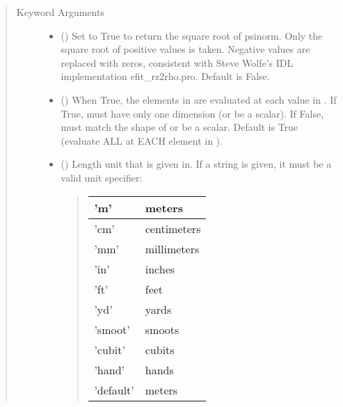 \documentclass[letterpaper,10pt,english]{sphinxmanual}
\begin{document}
\begin{fulllineitems}
\begin{fulllineitems}
\begin{quote}
\begin{description}
\begin{itemize}
\end{itemize}

\item[{Keyword Arguments}] \leavevmode\begin{itemize}
\item {} 
 () \textendash{} Set to True to return the square root of psinorm.
Only the square root of positive values is taken. Negative
values are replaced with zeros, consistent with Steve Wolfe’s
IDL implementation efit\_rz2rho.pro. Default is False.

\item {} 
 () \textendash{} When True, the elements in  are evaluated
at each value in . If True,  must have only one dimension
(or be a scalar). If False,  must match the shape of 
or be a scalar. Default is True (evaluate ALL  at EACH
element in ).

\item {} 
 () \textendash{} 
Length unit that  is given in.
If a string is given, it must be a valid unit specifier:
\begin{quote}


\begin{savenotes}\sphinxattablestart
\centering
\begin{tabulary}{\linewidth}[t]{|T|T|}
\hline

’m’
&
meters
\\
\hline
’cm’
&
centimeters
\\
\hline
’mm’
&
millimeters
\\
\hline
’in’
&
inches
\\
\hline
’ft’
&
feet
\\
\hline
’yd’
&
yards
\\
\hline
’smoot’
&
smoots
\\
\hline
’cubit’
&
cubits
\\
\hline
’hand’
&
hands
\\
\hline
’default’
&
meters
\\
\hline
\end{tabulary}
\par
\sphinxattableend\end{savenotes}
\end{quote}


\end{itemize}
\end{description}
\end{quote}
\end{fulllineitems}
\end{fulllineitems}
\end{document}
